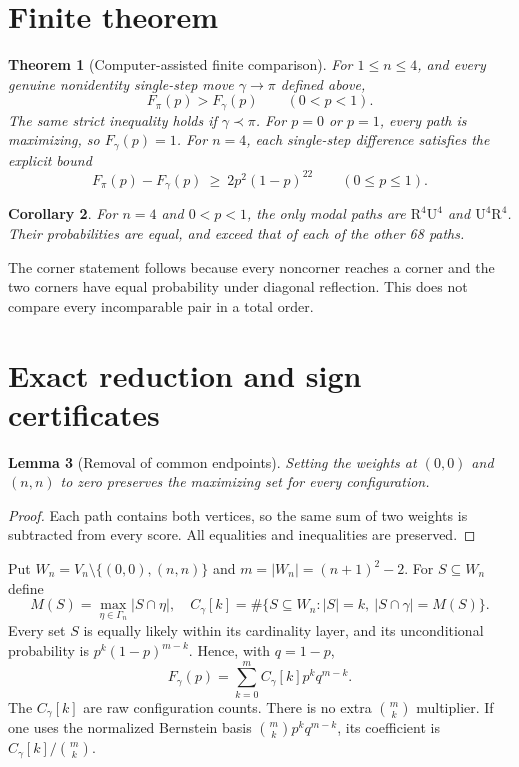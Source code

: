 \documentclass[11pt,a4paper]{article}
\newtheorem{theorem}{Theorem}
\newtheorem{lemma}[theorem]{Lemma}
\newtheorem{corollary}[theorem]{Corollary}
\newcommand{\R}{\mathrm R}
\newcommand{\U}{\mathrm U}
\begin{document}
\section{Finite theorem}
\begin{theorem}[Computer-assisted finite comparison]\label{thm:main}
For $1\leq n\leq4$, and every genuine nonidentity single-step move
$\gamma\longrightarrow\pi$ defined above,
\[
 F_\pi(p)>F_\gamma(p)\qquad(0<p<1).
\]
The same strict inequality holds if $\gamma\prec\pi$.
For $p=0$ or $p=1$, every path is maximizing, so $F_\gamma(p)=1$.
For $n=4$, each single-step difference satisfies the explicit bound
\[
 F_\pi(p)-F_\gamma(p)\ \geq\ 2p^2(1-p)^{22}
 \qquad(0\leq p\leq1).
\]
\end{theorem}
\begin{corollary}
For $n=4$ and $0<p<1$, the only modal paths are
$\R^4\U^4$ and $\U^4\R^4$. Their probabilities are equal, and exceed
that of each of the other 68 paths.
\end{corollary}
The corner statement follows because every noncorner reaches a corner
and the two corners have equal probability under diagonal reflection.
This does not compare every incomparable pair in a total order.

\section{Exact reduction and sign certificates}
\begin{lemma}[Removal of common endpoints]\label{lem:endpoints}
Setting the weights at $(0,0)$ and $(n,n)$ to zero preserves the maximizing
set for every configuration.
\end{lemma}
\begin{proof}
Each path contains both vertices, so the same sum of two weights is
subtracted from every score. All equalities and inequalities are preserved.
\end{proof}

Put $W_n=V_n\setminus\{(0,0),(n,n)\}$ and $m=|W_n|=(n+1)^2-2$.
For $S\subseteq W_n$ define
\[
 M(S)=\max_{\eta\in\Gamma_n}|S\cap\eta|,\quad
 C_\gamma[k]=
 \#\{S\subseteq W_n:|S|=k,\ |S\cap\gamma|=M(S)\}.
\]
Every set $S$ is equally likely within its cardinality layer, and its
unconditional probability is $p^k(1-p)^{m-k}$. Hence, with $q=1-p$,
\begin{equation}\label{eq:raw}
 F_\gamma(p)=\sum_{k=0}^m C_\gamma[k]p^kq^{m-k}.
\end{equation}
The $C_\gamma[k]$ are raw configuration counts. There is no extra
$\binom mk$ multiplier. If one uses the normalized Bernstein basis
$\binom mk p^kq^{m-k}$, its coefficient is $C_\gamma[k]/\binom mk$.
\end{document}
